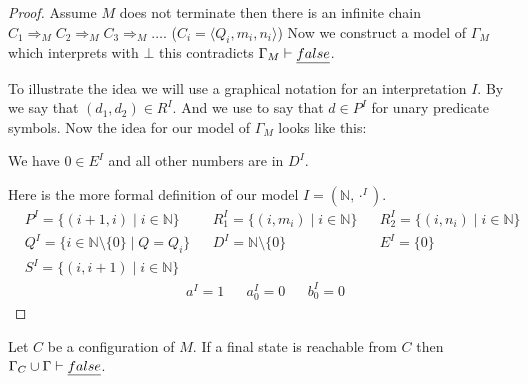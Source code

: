 \begin{proof}
	Assume $M$ does not terminate then there is an infinite chain $C_1\Rightarrow_M C_2\Rightarrow_M C_3\Rightarrow_M\dots$. ($C_i=\langle Q_i,m_i,n_i\rangle$) Now we construct a model of $\Gamma_M$ which interprets \false{} with $\bot$ this contradicts $\Gamma_M\vdash\emph{false}$.
	
	To illustrate the idea we will use a graphical notation for an interpretation $I$.
	By
	we say that $(d_1,d_2)\in R^I$. And we use
	to say that $d\in P^I$ for unary predicate symbols. Now the idea for our model of $\Gamma_M$ looks like this:
	
	\begin{figure}[H]
		
	\end{figure}
	We have $0\in E^I$ and all other numbers are in $D^I$.
	
	Here is the more formal definition of our model $I=(\mathbb{N},\cdot^I)$.
	\begin{align*}%
		  & P^I=\{(i+1,i)\mid i\in\mathbb{N}\}              &   & R_1^I=\{(i,m_i)\mid i\in\mathbb{N}\} &   & R_2^I=\{(i,n_i)\mid i\in\mathbb{N}\} \\
		  & Q^I=\{ i\in\mathbb{N}\setminus\{0\}\mid Q=Q_i\} &   & D^I=\mathbb{N}\setminus\{0\}         &   & E^I=\{0\}                            \\
		& S^I=\{(i,i+1)\mid i\in\mathbb{N}\}
	\end{align*}
	\begin{align*}
		  & a^I=1 &   & a_0^I=0 &   & b_0^I=0 
	\end{align*}
\end{proof}
\begin{claim}\label{cla.18}
	Let $C$ be a configuration of $M$. If a final state is reachable from $C$ then $\Gamma_C\cup\Gamma\vdash\emph{false}$.
\end{claim}
